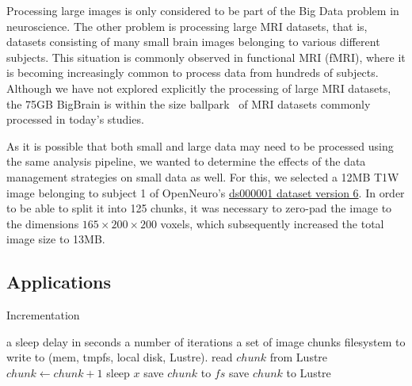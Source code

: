 \documentclass{IEEEtran}
\newcommand{\Desc}[2]{\State \makebox[2em][l]{#1}#2}
\begin{document}
Processing large images is only considered to be part of the Big Data problem 
in neuroscience. The other problem is processing large MRI datasets, 
that is, datasets consisting of many small brain images belonging to 
various different subjects. This situation is commonly observed in 
functional MRI (fMRI), where it is becoming increasingly common to 
process data from hundreds of subjects. Although we have not explored 
explicitly the processing of large MRI datasets, the 75GB BigBrain is 
within the size ballpark~\cite{van2014human} of 
MRI datasets commonly processed in today's studies.

As it is possible that both small and large data may need to be processed using
the same analysis pipeline, we 
wanted to determine the effects of the data management strategies on small 
data as well. For this, we selected a 12MB T1W image belonging to 
subject 1 of OpenNeuro's 
\href{https://openneuro.org/datasets/ds000001/versions/00006/file-display/sub-01:anat:sub-01_T1w.nii.gz}{ds000001 
dataset version 6}. In order to be able to split it into 125 chunks, it 
was necessary to zero-pad the image to the dimensions
$165\times200\times200$ voxels, which subsequently increased the total image size to 13MB.

\subsection{Applications} %
\begin{algorithm}\caption{Incrementation}\label{alg:incrementation}
    \begin{algorithmic}[1]
    \Input
    \Desc{$x$}{a sleep delay in seconds}
    \Desc{$n$}{a number of iterations}
    \Desc{$C$}{a set of image chunks}
    \Desc{$fs$}{filesystem to write to (mem, tmpfs, local disk, Lustre).}
    \EndInput
    \State read $chunk$ from Lustre
        \State $chunk\gets chunk+1$
        \State sleep $x$
        \State save $chunk$ to $fs$
        \EndIf
    \EndFor
    \State save $chunk$ to Lustre
    \EndFor
\end{algorithmic}
\end{algorithm}
\end{document}
